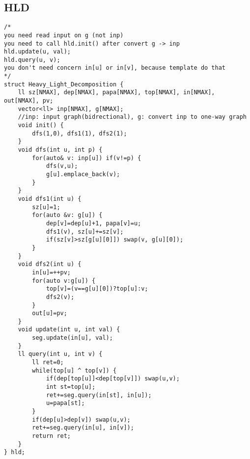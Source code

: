 \documentclass[landscape, 8pt, a4paper, oneside, twocolumn]{extarticle}
\begin{document}
\subsection {HLD}
\begin{verbatim}
/*
you need read input on g (not inp)
you need to call hld.init() after convert g -> inp 
hld.update(u, val);
hld.query(u, v);
you don't need concern in[u] or in[v], because template do that
*/
struct Heavy_Light_Decomposition {
    ll sz[NMAX], dep[NMAX], papa[NMAX], top[NMAX], in[NMAX], out[NMAX], pv;
    vector<ll> inp[NMAX], g[NMAX];
    //inp: input graph(bidrectional), g: convert inp to one-way graph
    void init() {
        dfs(1,0), dfs1(1), dfs2(1);
    }
    void dfs(int u, int p) {
        for(auto& v: inp[u]) if(v!=p) {
            dfs(v,u);
            g[u].emplace_back(v);
        }
    }
    void dfs1(int u) {
        sz[u]=1;
        for(auto &v: g[u]) {
            dep[v]=dep[u]+1, papa[v]=u;
            dfs1(v), sz[u]+=sz[v];
            if(sz[v]>sz[g[u][0]]) swap(v, g[u][0]);
        }
    }
    void dfs2(int u) {
        in[u]=++pv;
        for(auto v:g[u]) {
            top[v]=(v==g[u][0])?top[u]:v;
            dfs2(v);
        }
        out[u]=pv;
    }
    void update(int u, int val) {
        seg.update(in[u], val);                  
    }
    ll query(int u, int v) {
        ll ret=0;
        while(top[u] ^ top[v]) {
            if(dep[top[u]]<dep[top[v]]) swap(u,v);
            int st=top[u];
            ret+=seg.query(in[st], in[u]);     
            u=papa[st];
        }
        if(dep[u]>dep[v]) swap(u,v);
        ret+=seg.query(in[u], in[v]);            
        return ret;
    }
} hld;
\end{verbatim}
\newpage
\end{document}
